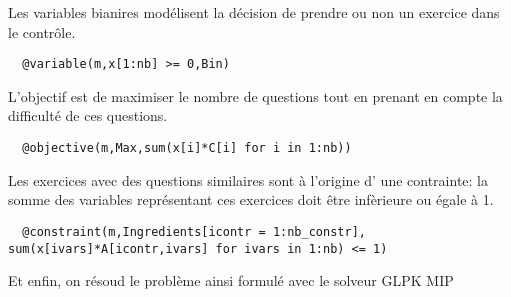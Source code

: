 Les variables bianires modélisent la décision de prendre ou non un exercice dans le contrôle.


\begin{lstlisting}
  @variable(m,x[1:nb] >= 0,Bin)
\end{lstlisting}


L'objectif est de maximiser le nombre de questions tout en prenant en compte la difficulté de ces questions.


\begin{lstlisting}
  @objective(m,Max,sum(x[i]*C[i] for i in 1:nb))
\end{lstlisting}

Les exercices avec des questions similaires sont à l'origine d' une contrainte: la somme des variables représentant ces exercices doit être infèrieure ou égale à 1.


\begin{lstlisting}
  @constraint(m,Ingredients[icontr = 1:nb_constr], sum(x[ivars]*A[icontr,ivars] for ivars in 1:nb) <= 1)
\end{lstlisting}

Et enfin, on résoud le problème ainsi formulé avec le solveur GLPK MIP

%
%

\vspace{5mm}
\noindent
{}
\vspace{2mm}

